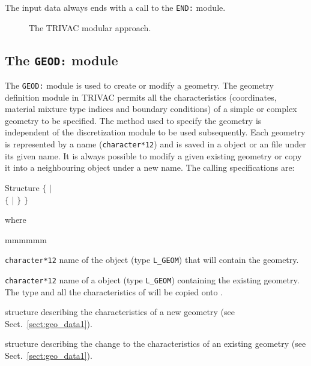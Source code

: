 \vskip 0.2cm

The input data always ends with a call to the {\tt END:} module.

\begin{figure}[htbp]
\begin{center} 
\epsfxsize=16cm
\centerline{ }
\parbox{14cm}{\caption{The TRIVAC modular approach.}
\label{fig:trivac3}} 
\end{center} 
\end{figure}

\subsection{The {\tt GEOD:} module}

The {\tt GEOD:} module is used to create or modify a geometry. The geometry definition module in TRIVAC permits all the characteristics (coordinates, material mixture type indices and boundary conditions) of a simple or complex geometry to be specified. The method used to specify the geometry is independent of the discretization module to be used subsequently. Each geometry is represented by a name ({\tt character*12}) and is saved in a  object or an  file under its given name. It is always possible to modify a given existing geometry or copy it into a neighbouring  object under a new name. The calling specifications are:

\begin{DataStructure}{Structure }
$\{$  \moc{:=}   $|$ \\
 \moc{:=}  $\{$  $|$  $\}$ \moc{::}  $\}$
\end{DataStructure}

\noindent

\noindent where
\begin{ListeDeDescription}{mmmmmm}

\item[\dusa{GEOM1}] {\tt character*12} name of the  object (type {\tt L\_GEOM}) that will contain the geometry.

\item[\dusa{GEOM2}] {\tt character*12} name of a  object (type {\tt L\_GEOM}) containing the existing geometry. The type and all the characteristics of  will be copied onto .

\item[\dstr{geo\_data1}] structure describing the characteristics of a new geometry (see Sect.~\ref{sect:geo_data1}).

\item[\dstr{geo\_data2}] structure describing the change to the characteristics of an existing geometry (see Sect.~\ref{sect:geo_data1}).

\end{ListeDeDescription}

